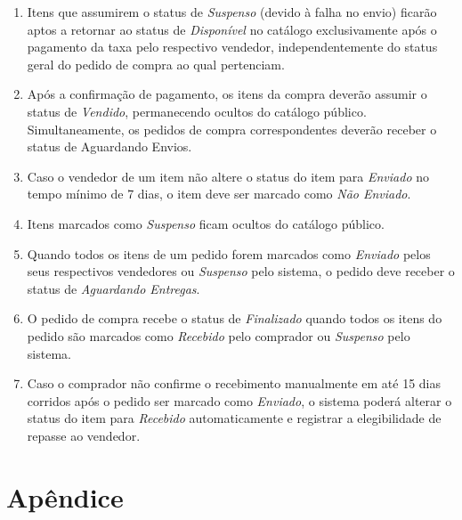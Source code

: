 ﻿\documentclass[12pt,a4paper]{article}
\begin{document}
\begin{enumerate}[label=RD\arabic*:]
    \item Itens que assumirem o status de \textit{Suspenso} (devido à falha no envio) ficarão aptos a retornar ao status de \textit{Disponível} no catálogo exclusivamente após o pagamento da taxa pelo respectivo vendedor, independentemente do status geral do pedido de compra ao qual pertenciam.

    \item Após a confirmação de pagamento, os itens da compra deverão assumir o status de \textit{Vendido}, permanecendo ocultos do catálogo público. Simultaneamente, os pedidos de compra correspondentes deverão receber o status de Aguardando Envios. 

    \item Caso o vendedor de um item não altere o status do item para \textit{Enviado} no tempo mínimo de 7 dias, o item deve ser marcado como \textit{Não Enviado}.

    \item Itens marcados como \textit{Suspenso} ficam ocultos do catálogo público. 

    \item Quando todos os itens de um pedido forem marcados como \textit{Enviado} pelos seus respectivos vendedores ou \textit{Suspenso} pelo sistema, o pedido deve receber o status de \textit{Aguardando Entregas}.

    \item O pedido de compra recebe o status de \textit{Finalizado} quando todos os itens do pedido são marcados como \textit{Recebido} pelo comprador ou \textit{Suspenso} pelo sistema.      

    \item Caso o comprador não confirme o recebimento manualmente em até 15 dias corridos após o pedido ser marcado como \textit{Enviado}, o sistema poderá alterar o status do item para \textit{Recebido} automaticamente e registrar a elegibilidade de repasse ao vendedor.

\end{enumerate}

\clearpage
\section{Apêndice}
\label{sec:Apendice}
\end{document}
